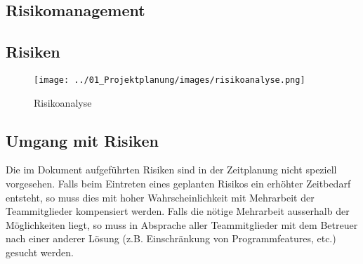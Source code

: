 \begin{landscape}
\chapter{Risikomanagement}
\section{Risiken}
\begin{figure}[H]
\centering
\texttt{[image: ../01\_Projektplanung/images/risikoanalyse.png]}
\caption{Risikoanalyse}
\end{figure}
\end{landscape}
\section{Umgang mit Risiken}
Die im Dokument aufgeführten Risiken sind in der Zeitplanung nicht speziell vorgesehen. Falls beim Eintreten eines geplanten Risikos ein erhöhter Zeitbedarf entsteht, so muss dies mit hoher Wahrscheinlichkeit mit Mehrarbeit der Teammitglieder kompensiert werden. Falls die nötige Mehrarbeit ausserhalb der Möglichkeiten liegt, so muss in Absprache aller Teammitglieder mit dem Betreuer nach einer anderer Lösung (z.B. Einschränkung von Programmfeatures, etc.) gesucht werden.